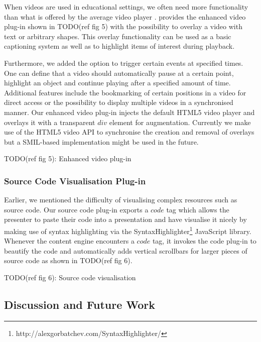 \documentclass[a4paper,12pt]{report}
\begin{document}
     When videos are used in educational settings, we often need more
     functionality than what is offered by the average video player
     \citep{reuss-1}. \mxp provides the enhanced video plug-in shown in
     TODO(ref fig 5) with the possibility to overlay a video with text or
     arbitrary shapes. This overlay functionality can be used as a basic
     captioning system as well as to highlight items of interest during
     playback.

     Furthermore, we added the option to trigger certain events at specified
     times. One can define that a video should automatically pause at a certain
     point, highlight an object and continue playing after a specified amount
     of time. Additional features include the bookmarking of certain positions
     in a video for direct access or the possibility to display multiple videos
     in a synchronised manner. Our enhanced video plug-in injects the default
     HTML5 video player and overlays it with a transparent $div$ element for
     augmentation. Currently we make use of the HTML5 video API to synchronise
     the creation and removal of overlays but a SMIL-based implementation might
     be used in the future.

     TODO(ref fig 5): Enhanced video plug-in

    \subsubsection{Source Code Visualisation Plug-in}

     Earlier, we mentioned the difficulty of visualising complex resources such
     as source code. Our \mxp source code plug-in exports a $code$ tag which
     allows the presenter to paste their code into a presentation and have \mxp
     visualise it nicely by making use of syntax highlighting via the
     SyntaxHighlighter\footnote{http://alexgorbatchev.com/SyntaxHighlighter/}
     JavaScript library. Whenever the content engine encounters a $code$ tag,
     it invokes the code plug-in to beautify the code and automatically adds
     vertical scrollbars for larger pieces of source code as shown in TODO(ref
     fig 6).

     TODO(ref fig 6): Source code visualisation

   \subsection{Discussion and Future Work}
\end{document}
